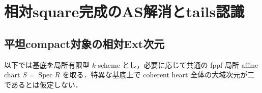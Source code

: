 \section{相対square完成のAS解消とtails認識}
\label{sec:qa-relative-square-completion}

\subsection{平坦compact対象の相対Ext次元}
\label{subsec:qa-flat-compact-ext-dimension}

以下では基底を局所有限型 $k$-scheme とし，必要に応じて共通の fppf
局所 affine chart $S=\operatorname{Spec}R$ を取る．特異な基底上で
coherent heart 全体の大域次元が二であるとは仮定しない．

